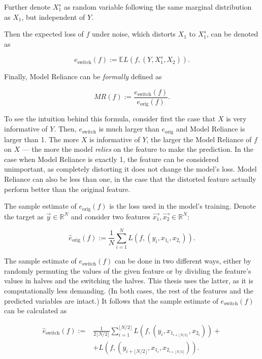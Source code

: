 			Further denote $X_1^s$ as random variable following the same marginal distribution as $X_1$, but independent of $Y$. 
			
			Then the expected loss of $f$ under noise, which distorts $X_1$ to $X_1^s$, can be denoted as 
			
			\begin{equation*}
				e_{\text{switch}}(f):= \mathbb{E} L(f,(Y,X_1^s, X_2)).
			\end{equation*} 
			
			Finally, Model Reliance can be \textit{formally} defined as 
			
			\begin{equation*}
				MR(f):=\frac{e_{\text{switch}}(f)}{e_{\text{orig}}(f)}.
			\end{equation*}
			
			To see the intuition behind this formula, consider first the case that $X$ is very informative of $Y$. Then, 	$e_{\text{switch}}$ is much larger than $e_{\text{orig}}$ and Model Reliance is larger than 1. The more $X$ is informative of $Y$, the larger the  Model Reliance of $f$ on $X$ --- the more the model \textit{relies} on the feature to make the prediction. In the case when Model Reliance is exactly 1, the feature can be considered unimportant, as completely distorting it does not change the model's loss. Model Reliance can also be less than one, in the case that the distorted feature actually perform better than the original feature.
					
			The sample estimate of $e_{\text{orig}}(f)$ is the loss used in the model's training. Denote the target as $\vec{y} \in \mathbb{R}^N$ and consider two features $\vec{x_1}, \vec{x_2} \in \mathbb{R}^{N}$:
			
			\begin{equation*}
				\hat{e}_{\text{orig}}(f):= \frac{1}{N} \sum_{i=1}^{N} L\left(f, (y_i, x_{1_i}, x_{2_i}) \right).
			\end{equation*} 
			
			The sample estimate of $e_{\text{switch}}(f)$ can be done in two different ways, either by randomly permuting the values of the given feature or by dividing the feature's values in halves and the switching the halves. This thesis uses the latter, as it is computationally less demanding. (In both cases, the rest of the features and the predicted variables are intact.) It follows that the sample estimate of $e_{\text{switch}}(f)$ can be calculated as
			
			
			\begin{equation*}
				\begin{split}
					\hat{e}_{\text{switch}}(f):= & \frac{1}{2 \lfloor N/2 \rfloor} \sum_{i=1}^{\lfloor N/2 \rfloor} L \left(f, \left( y_i, x_{1_{i+\lfloor N/2 \rfloor}}, x_{2_{i}} \right) \right) + \\ 
					& + L \left( f, \left(y_{i+\lfloor N/2 \rfloor}, x_{1_{i}}, x_{2_{i+\lfloor N/2 \rfloor}} \right) \right). 
				\end{split}
			\end{equation*}
			
